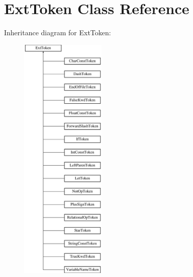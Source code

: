 \hypertarget{class_ext_token}{}\section{Ext\+Token Class Reference}
\label{class_ext_token}
Inheritance diagram for Ext\+Token\+:\begin{figure}[H]
\begin{center}
\leavevmode
\includegraphics[height=12.000000cm]{class_ext_token}
\end{center}
\end{figure}
